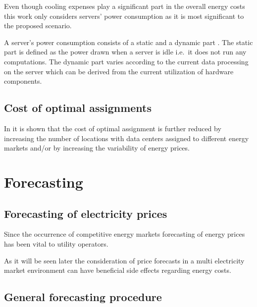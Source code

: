 Even though cooling expenses play a significant part in the overall energy costs this work only considers servers' power consumption as it is most significant to the proposed scenario. 

A server's power consumption consists of a static and a dynamic part \cite{liu2013performance}. The static part is defined as the power drawn when a server is idle i.e.~it does not run any computations. The dynamic part varies according to the current data processing on the server which can be derived from the current utilization of hardware components. 


\subsection{Cost of optimal assignments}


In \cite{de2013study} it is shown that the cost of optimal assignment is further reduced by increasing the number of locations with data centers assigned to different energy markets and/or by increasing the variability of energy prices. 






\section{Forecasting}

\subsection{Forecasting of electricity prices}

Since the occurrence of competitive energy markets forecasting of energy prices has been vital to utility operators. 

As it will be seen later the consideration of price forecasts in a multi electricity market environment can have beneficial side effects regarding energy costs. 


\subsection{General forecasting procedure}

